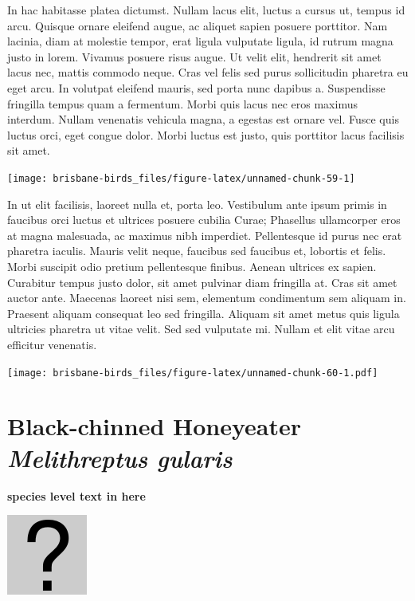 \documentclass[]{book}
\let\origfigure\figure
\let\endorigfigure\endfigure
\renewenvironment{figure}[1][2] {
  \expandafter\origfigure\expandafter[H]
} {
  \endorigfigure
}
\begin{document}
In hac habitasse platea dictumst. Nullam lacus elit, luctus a cursus ut,
tempus id arcu. Quisque ornare eleifend augue, ac aliquet sapien posuere
porttitor. Nam lacinia, diam at molestie tempor, erat ligula vulputate
ligula, id rutrum magna justo in lorem. Vivamus posuere risus augue. Ut
velit elit, hendrerit sit amet lacus nec, mattis commodo neque. Cras vel
felis sed purus sollicitudin pharetra eu eget arcu. In volutpat eleifend
mauris, sed porta nunc dapibus a. Suspendisse fringilla tempus quam a
fermentum. Morbi quis lacus nec eros maximus interdum. Nullam venenatis
vehicula magna, a egestas est ornare vel. Fusce quis luctus orci, eget
congue dolor. Morbi luctus est justo, quis porttitor lacus facilisis sit
amet.

\begin{figure}
\texttt{[image: brisbane-birds\_files/figure-latex/unnamed-chunk-59-1]} \caption{insert figure caption}\label{fig:unnamed-chunk-59}
\end{figure}

In ut elit facilisis, laoreet nulla et, porta leo. Vestibulum ante ipsum
primis in faucibus orci luctus et ultrices posuere cubilia Curae;
Phasellus ullamcorper eros at magna malesuada, ac maximus nibh
imperdiet. Pellentesque id purus nec erat pharetra iaculis. Mauris velit
neque, faucibus sed faucibus et, lobortis et felis. Morbi suscipit odio
pretium pellentesque finibus. Aenean ultrices ex sapien. Curabitur
tempus justo dolor, sit amet pulvinar diam fringilla at. Cras sit amet
auctor ante. Maecenas laoreet nisi sem, elementum condimentum sem
aliquam in. Praesent aliquam consequat leo sed fringilla. Aliquam sit
amet metus quis ligula ultricies pharetra ut vitae velit. Sed sed
vulputate mi. Nullam et elit vitae arcu efficitur venenatis.

\begin{figure}
\centering
\texttt{[image: brisbane-birds\_files/figure-latex/unnamed-chunk-60-1.pdf]}
\caption{\label{fig:unnamed-chunk-60}insert figure caption}
\end{figure}

\section{\texorpdfstring{Black-chinned Honeyeater \emph{Melithreptus
gularis}}{Black-chinned Honeyeater Melithreptus gularis}}\label{black-chinned-honeyeater-melithreptus-gularis}

\textbf{species level text in here}

\begin{figure}
\centering
\includegraphics{assets/missing.png}
\caption{No image for species}
\end{figure}
\end{document}
